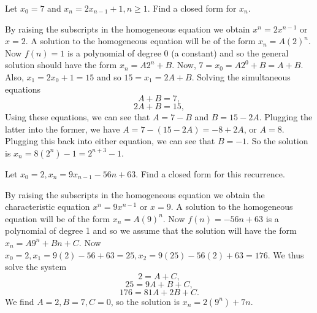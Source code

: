 \begin{exa}\label{exa:partSol}
Let $x_0 = 7$ and $x_n = 2x_{n - 1} + 1, n \geq 1.$ Find a closed form for $x_n.$
\begin{sol}
By raising the subscripts in the homogeneous equation we
obtain $x^n = 2x^{n - 1}$ or $x = 2$. A solution to the
homogeneous equation will be of the form $x_n = A(2)^n$. 
Now $f(n)= 1$ is a polynomial of degree 0 (a constant) and 
so the general solution should have
the form $x_n = A2^n + B$. Now, $7 = x_0 = A2^0 + B = A + B$.
Also, $x_1 = 2x_0 + 1 = 15$ and so $15 = x_1 = 2A + B$. Solving
the simultaneous equations
$$A + B = 7,$$
$$2A + B = 15,$$
Using these equations, we can see that $A=7-B$ and $B=15-2A$.
Plugging the latter into the former, we have $A=7-(15-2A)=-8+2A$, or $A=8$.
Plugging this back into either equation, we can see that $B=-1$.
So the solution is $x_n = 8(2^n) - 1 = 2^{n + 3} - 1.$
\end{sol}
\end{exa}

\newpage
\begin{exer}
Let $x_0 = 2, x_n = 9x_{n - 1} - 56n + 63$. Find a closed form for
this recurrence.
\vspace*{3.75in}
\begin{answer}
By raising the subscripts in the homogeneous equation we
obtain the characteristic equation $x^n = 9x^{n - 1}$ or $x = 9$.
A solution to the homogeneous equation will be of the form $x_n =
A(9)^n$. Now $f(n) = -56n + 63$ is a polynomial of degree 1 and so
we assume that the solution will have the form $x_n = A9^n + Bn + C$. 
Now $x_0 = 2,
x_1 = 9(2) - 56 + 63 = 25, x_2 = 9(25) - 56(2) + 63 = 176$. We
thus solve the system
$$2 = A + C,$$
$$25 = 9A + B + C,$$
$$176 = 81A + 2B + C.$$
We find $A = 2, B = 7, C = 0$, so the solution is $x_n = 2(9^n) + 7n.$
\end{answer}
\end{exer}




